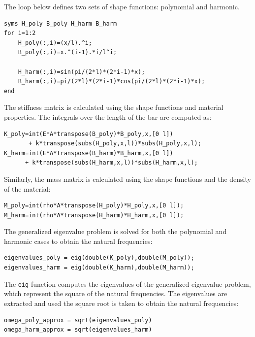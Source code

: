 \documentclass[12pt]{article}
\begin{document}
The loop below defines two sets of shape functions: polynomial and harmonic.
\begin{verbatim}
syms H_poly B_poly H_harm B_harm                     
for i=1:2                  
    H_poly(:,i)=(x/l).^i;
    B_poly(:,i)=x.^(i-1).*i/l^i;

    H_harm(:,i)=sin(pi/(2*l)*(2*i-1)*x);
    B_harm(:,i)=pi/(2*l)*(2*i-1)*cos(pi/(2*l)*(2*i-1)*x);
end 
\end{verbatim}
The stiffness matrix is calculated using the shape functions and material properties. The integrals over the length of the bar are computed as:
\begin{verbatim}
K_poly=int(E*A*transpose(B_poly)*B_poly,x,[0 l]) 
	   + k*transpose(subs(H_poly,x,l))*subs(H_poly,x,l);
K_harm=int(E*A*transpose(B_harm)*B_harm,x,[0 l]) 
	  + k*transpose(subs(H_harm,x,l))*subs(H_harm,x,l);
\end{verbatim}
Similarly, the mass matrix is calculated using the shape functions and the density of the material:
\begin{verbatim}
M_poly=int(rho*A*transpose(H_poly)*H_poly,x,[0 l]);    
M_harm=int(rho*A*transpose(H_harm)*H_harm,x,[0 l]);    
\end{verbatim}
The generalized eigenvalue problem is solved for both the polynomial and harmonic cases to obtain the natural frequencies:
\begin{verbatim}
eigenvalues_poly = eig(double(K_poly),double(M_poly));
eigenvalues_harm = eig(double(K_harm),double(M_harm));
\end{verbatim}

The \texttt{eig} function computes the eigenvalues of the generalized eigenvalue problem, which represent the square of the natural frequencies. The eigenvalues are extracted and used the square root is taken to obtain the natural frequencies:

\begin{verbatim}
omega_poly_approx = sqrt(eigenvalues_poly)  
omega_harm_approx = sqrt(eigenvalues_harm)
\end{verbatim}
\end{document}
